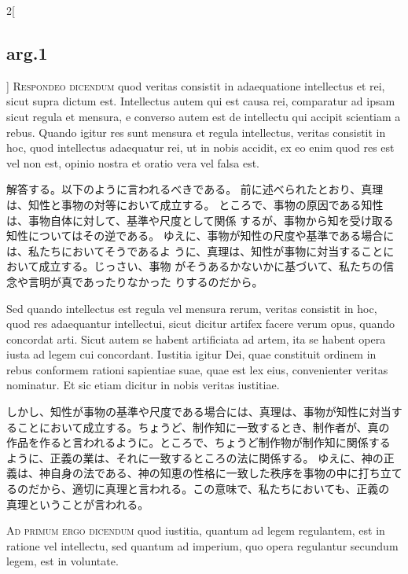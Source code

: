 \documentclass[paper=a4paper,fontsize=10pt,jafontsize=9pt,titlepage]{jlreq}
\begin{document}
\begin{paracol}{2}[\subsection{arg.1}]
{\scshape Respondeo dicendum} quod veritas consistit in
adaequatione intellectus et rei, sicut supra dictum est. Intellectus
autem qui est causa rei, comparatur ad ipsam sicut regula et mensura, e
converso autem est de intellectu qui accipit scientiam a rebus. Quando
igitur res sunt mensura et regula intellectus, veritas consistit in hoc,
quod intellectus adaequatur rei, ut in nobis accidit, ex eo enim quod
res est vel non est, opinio nostra et oratio vera vel falsa est.

\switchcolumn

解答する。以下のように言われるべきである。
前に述べられたとおり、真理は、知性と事物の対等において成立する。
ところで、事物の原因である知性は、事物自体に対して、基準や尺度として関係
 するが、事物から知を受け取る知性についてはその逆である。
ゆえに、事物が知性の尺度や基準である場合には、私たちにおいてそうであるよ
 うに、真理は、知性が事物に対当することにおいて成立する。じっさい、事物
 がそうあるかないかに基づいて、私たちの信念や言明が真であったりなかった
 りするのだから。

\switchcolumn*

Sed
quando intellectus est regula vel mensura rerum, veritas consistit in
hoc, quod res adaequantur intellectui, sicut dicitur artifex facere
verum opus, quando concordat arti. Sicut autem se habent artificiata ad
artem, ita se habent opera iusta ad legem cui concordant. Iustitia
igitur Dei, quae constituit ordinem in rebus conformem rationi
sapientiae suae, quae est lex eius, convenienter veritas nominatur. Et
sic etiam dicitur in nobis veritas iustitiae.

\switchcolumn

しかし、知性が事物の基準や尺度である場合には、真理は、事物が知性に対当す
 ることにおいて成立する。ちょうど、制作知に一致するとき、制作者が、真の
 作品を作ると言われるように。ところで、ちょうど制作物が制作知に関係する
 ように、正義の業は、それに一致するところの法に関係する。
ゆえに、神の正義は、神自身の法である、神の知恵の性格に一致した秩序を事物の中に打ち立て
 るのだから、適切に真理と言われる。この意味で、私たちにおいても、正義の
 真理ということが言われる。

\switchcolumn*[\subsection{ad.1}]

{\scshape Ad primum ergo dicendum} quod iustitia,
quantum ad legem regulantem, est in ratione vel intellectu, sed quantum
ad imperium, quo opera regulantur secundum legem, est in voluntate.


\end{paracol}
\end{document}
